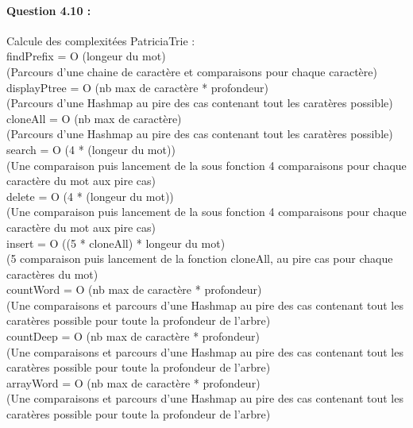 \documentclass{article}
\begin{document}
\paragraph{Question 4.10 :}

Calcule des complexit\'ees PatriciaTrie :\\

findPrefix = O (longeur du mot)\\
(Parcours d'une chaine de caract\`ere et comparaisons pour chaque caract\`ere)\\

displayPtree = O (nb max de caract\`ere * profondeur)\\
(Parcours d'une Hashmap au pire des cas contenant tout les carat\`eres possible)
\\

cloneAll = O (nb max de caract\`ere)\\
(Parcours d'une Hashmap au pire des cas contenant tout les carat\`eres possible)
\\

search = O (4 * (longeur du mot))\\
(Une comparaison puis lancement de la sous fonction 4 comparaisons pour chaque
caract\`ere du mot aux pire cas)\\

delete = O (4 * (longeur du mot))\\
(Une comparaison puis lancement de la sous fonction 4 comparaisons pour chaque 
caract\`ere du mot aux pire cas)\\

insert = O ((5 * cloneAll) * longeur du mot)\\
(5 comparaison puis lancement de la fonction cloneAll, au pire cas pour chaque
caract\`eres du mot)\\

countWord = O (nb max de caract\`ere * profondeur)\\
(Une comparaisons et parcours d'une Hashmap au pire des cas contenant tout
les carat\`eres possible pour toute la profondeur de l'arbre)\\

countDeep = O (nb max de caract\`ere * profondeur)\\
(Une comparaisons et parcours d'une Hashmap au pire des cas contenant tout
les carat\`eres possible pour toute la profondeur de l'arbre)\\

arrayWord = O (nb max de caract\`ere * profondeur)\\
(Une comparaisons et parcours d'une Hashmap au pire des cas contenant tout
les carat\`eres possible pour toute la profondeur de l'arbre)\\
\end{document}
